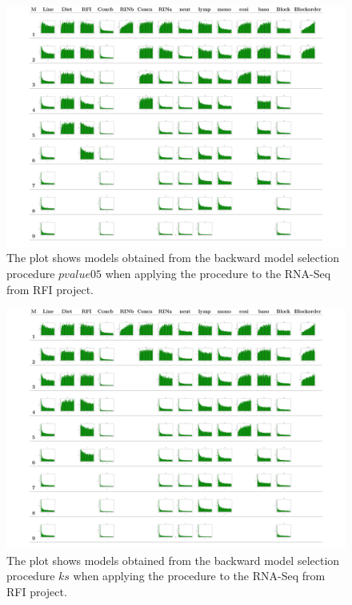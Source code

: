 \documentclass[12pt, letter]{article}\usepackage[]{graphicx}\usepackage[]{color}
\begin{document}
\begin{figure}[H]
\centering
\includegraphics[scale = 0.22]{PlotG9P2PairedEndCBCpvalue05.png}
\caption{The plot shows models obtained from the backward model selection procedure $pvalue05$ when applying the procedure to  the RNA-Seq from RFI project.}
\label{pvalue05}
\end{figure}


\begin{figure}[H]
\centering
\includegraphics[scale = 0.22]{PlotG9P2PairedEndCBCks.png}
\caption{The plot shows models obtained from the backward model selection procedure $ks$ when applying the procedure to the RNA-Seq from RFI project. }
\label{ks}
\end{figure}
\end{document}
